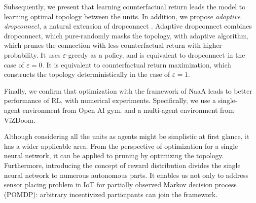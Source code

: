Subsequently, we present that learning counterfactual return leads the model to learning optimal topology between the units.
In addition, we propose {\em adaptive dropconnect}, a natural extension of dropconnect \citep{wan2013regularization}.
Adaptive dropconnect combines dropconnect, which pure-randomly masks the topology, with adaptive algorithm, which prunes the connection with less counterfactual return with higher probability.
It uses $\varepsilon$-greedy as a policy, and is equivalent to dropconnect in the case of $\varepsilon = 0$. It is equivalent to counterfactual return maximization, which constructs the topology deterministically in the case of $\varepsilon = 1$.

Finally, we confirm that optimization with the framework of NaaA leads to better performance of RL, with numerical experiments.
Specifically, we use a single-agent environment from Open AI gym, and a multi-agent environment from ViZDoom.

Although considering all the units as agents might be simplistic at first glance, it has a wider applicable area.
From the perspective of optimization for a single neural network, it can be applied to pruning by optimizing the topology.
Furthermore, introducing the concept of reward distribution divides the single neural network to numerous autonomous parts.
It enables us not only to address sensor placing problem in IoT for partially observed Markov decision process (POMDP): arbitrary incentivized participants can join the framework.
 
